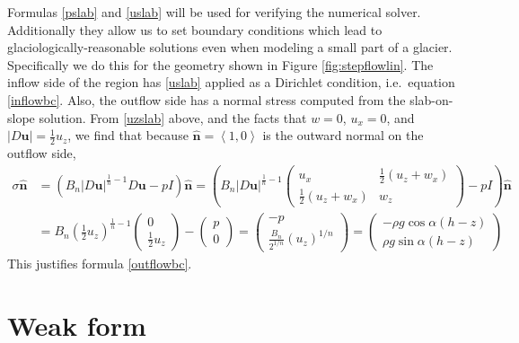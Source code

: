 \documentclass[letterpaper,final,12pt,reqno]{amsart}
\newcommand{\hbn}{\hat{\mathbf{n}}}
\newcommand{\bu}{\mathbf{u}}
\begin{document}
Formulas \eqref{pslab} and \eqref{uslab} will be used for verifying the numerical solver.  Additionally they allow us to set boundary conditions which lead to glaciologically-reasonable solutions even when modeling a small part of a glacier.  Specifically we do this for the geometry shown in Figure \ref{fig:stepflowlin}.  The inflow side of the region has \eqref{uslab} applied as a Dirichlet condition, i.e.~equation \eqref{inflowbc}.  Also, the outflow side has a normal stress computed from the slab-on-slope solution.  From \eqref{uzslab} above, and the facts that $w=0$, $u_x=0$, and $|D\bu| = \frac{1}{2} u_z$, we find that because $\hbn=\left<1,0\right>$ is the outward normal on the outflow side,
\begin{align*}
\sigma \hbn &= \left(B_n |D\bu|^{\frac{1}{n}-1} D\bu - pI\right)\hbn = \left(B_n |D\bu|^{\frac{1}{n}-1} \begin{pmatrix} u_x & \frac{1}{2}(u_z+w_x) \\ \frac{1}{2}(u_z+w_x) & w_z \end{pmatrix} - pI\right)\hbn \\
    &= B_n \left(\frac{1}{2} u_z\right)^{\frac{1}{n}-1} \begin{pmatrix} 0 \\ \frac{1}{2} u_z \end{pmatrix} - \begin{pmatrix} p \\ 0 \end{pmatrix} = \begin{pmatrix} - p \\ \frac{B_n}{2^{1/n}} (u_z)^{1/n} \end{pmatrix} = \begin{pmatrix} - \rho g\cos\alpha (h-z) \\ \rho g\sin\alpha (h-z) \end{pmatrix}
\end{align*}
This justifies formula \eqref{outflowbc}.


\section{Weak form}
\end{document}
